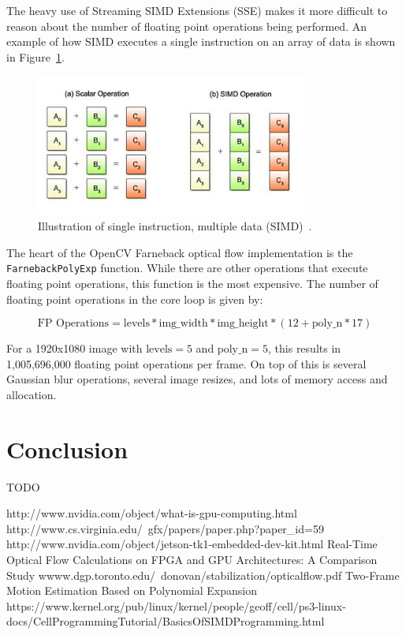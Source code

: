 \documentclass[12pt,letterpaper]{article}
\begin{document}
The heavy use of Streaming SIMD Extensions (SSE) makes it more difficult to
reason about the number of floating point operations being performed. An example
of how SIMD executes a single instruction on an array of data is shown in
Figure~\ref{fig:simd}.

\begin{figure}[h]
  \centering
    \includegraphics[width=0.8\textwidth]{img/simd.jpg}
  \caption{Illustration of single instruction, multiple data (SIMD)~\cite{simd}.}
  \label{fig:simd}
\end{figure}

The heart of the OpenCV Farneback optical flow implementation is the
\texttt{FarnebackPolyExp} function. While there are other operations that
execute floating point operations, this function is the most expensive. The
number of floating point operations in the core loop is given by:

$$
\text{FP Operations} = \text{levels} * \text{img\_width} * \text{img\_height}
                * (12 + \text{poly\_n} * 17)
$$

For a 1920x1080 image with $\text{levels}=5$ and $\text{poly\_n}=5$, this results in
1,005,696,000 floating point operations per frame. On top of this is several
Gaussian blur operations, several image resizes, and lots of memory access and
allocation.

\section{Conclusion}
TODO

\begin{thebibliography}{10}
    http://www.nvidia.com/object/what-is-gpu-computing.html
    http://www.cs.virginia.edu/~gfx/papers/paper.php?paper\_id=59
    http://www.nvidia.com/object/jetson-tk1-embedded-dev-kit.html
    Real-Time Optical Flow Calculations on FPGA and GPU Architectures: A Comparison
    Study
    wwww.dgp.toronto.edu/~donovan/stabilization/opticalflow.pdf
    Two-Frame Motion Estimation Based on Polynomial Expansion
    https://www.kernel.org/pub/linux/kernel/people/geoff/cell/ps3-linux-docs/CellProgrammingTutorial/BasicsOfSIMDProgramming.html
\end{thebibliography}
\end{document}

